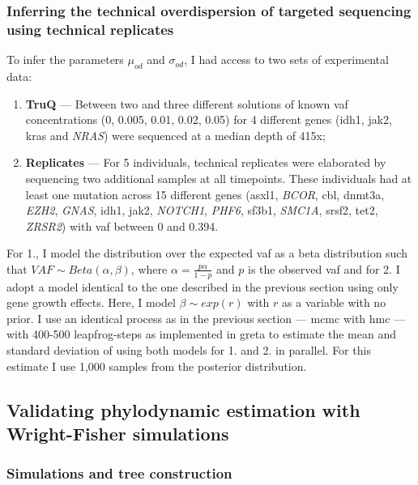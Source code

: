\subsubsection{Inferring the technical overdispersion of targeted sequencing using technical replicates}

To infer the parameters $\mu_{od}$ and $\sigma_{od}$, I had access to two sets of experimental data:

\begin{enumerate}
	\item \textbf{TruQ} --- Between two and three different solutions of known \ac{vaf} concentrations (0, 0.005, 0.01, 0.02, 0.05) for 4 different genes (\ac{idh1}, \ac{jak2}, \ac{kras} and \textit{NRAS}) were sequenced at a median depth of 415x;
	
	\item \textbf{Replicates} --- For 5 individuals, technical replicates were elaborated by sequencing two additional samples at all timepoints. These individuals had at least one mutation across 15 different genes (\ac{asxl1}, \textit{BCOR}, \ac{cbl}, \ac{dnmt3a}, \textit{EZH2}, \textit{GNAS}, \ac{idh1}, \ac{jak2}, \textit{NOTCH1}, \textit{PHF6}, \ac{sf3b1}, \textit{SMC1A}, \ac{srsf2}, \ac{tet2}, \textit{ZRSR2}) with \ac{vaf} between 0 and 0.394. 
\end{enumerate}

For 1., I model the distribution over the expected \ac{vaf} as a beta distribution such that $VAF \sim Beta(\alpha,\beta)$, where $\alpha=\frac{p\alpha}{1-p}$ and $p$ is the observed \ac{vaf} and for 2. I adopt a model identical to the one described in the previous section using only gene growth effects. Here, I model $\beta \sim exp(r)$ with $r$ as a variable with no prior. I use an identical process as in the previous section --- \ac{mcmc} with \ac{hmc} --- with 400-500 leapfrog-steps as implemented in greta \cite{Golding2019-wh} to estimate the mean and standard deviation of  using both models for 1. and 2. in parallel. For this estimate I use 1,000 samples from the posterior distribution.

\subsection{Validating phylodynamic estimation with Wright-Fisher simulations}

\subsubsection{Simulations and tree construction}

